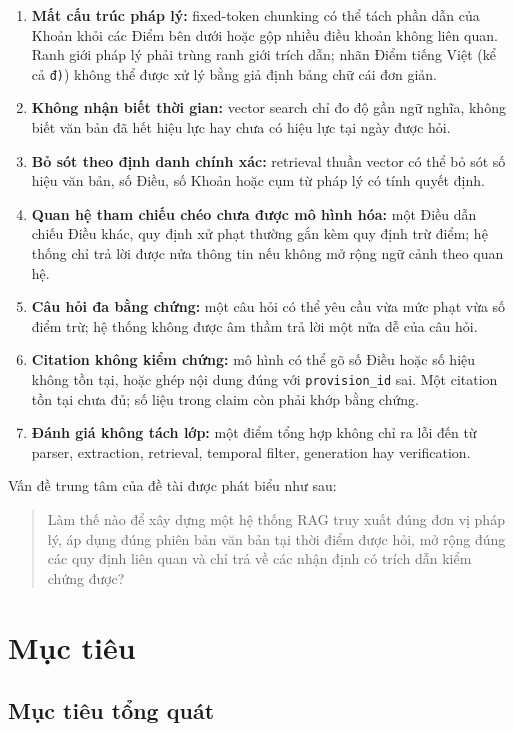 \documentclass[a4paper,12pt]{extreport}
\newcommand{\code}[1]{\texttt{#1}}
\begin{document}
\begin{enumerate}
  \item \textbf{Mất cấu trúc pháp lý:} fixed-token chunking có thể tách phần dẫn của Khoản khỏi các Điểm bên dưới hoặc gộp nhiều điều khoản không liên quan. Ranh giới pháp lý phải trùng ranh giới trích dẫn; nhãn Điểm tiếng Việt (kể cả \code{đ)}) không thể được xử lý bằng giả định bảng chữ cái đơn giản.
  \item \textbf{Không nhận biết thời gian:} vector search chỉ đo độ gần ngữ nghĩa, không biết văn bản đã hết hiệu lực hay chưa có hiệu lực tại ngày được hỏi.
  \item \textbf{Bỏ sót theo định danh chính xác:} retrieval thuần vector có thể bỏ sót số hiệu văn bản, số Điều, số Khoản hoặc cụm từ pháp lý có tính quyết định.
  \item \textbf{Quan hệ tham chiếu chéo chưa được mô hình hóa:} một Điều dẫn chiếu Điều khác, quy định xử phạt thường gắn kèm quy định trừ điểm; hệ thống chỉ trả lời được nửa thông tin nếu không mở rộng ngữ cảnh theo quan hệ.
  \item \textbf{Câu hỏi đa bằng chứng:} một câu hỏi có thể yêu cầu vừa mức phạt vừa số điểm trừ; hệ thống không được âm thầm trả lời một nửa dễ của câu hỏi.
  \item \textbf{Citation không kiểm chứng:} mô hình có thể gõ số Điều hoặc số hiệu không tồn tại, hoặc ghép nội dung đúng với \code{provision\_id} sai. Một citation tồn tại chưa đủ; số liệu trong claim còn phải khớp bằng chứng.
  \item \textbf{Đánh giá không tách lớp:} một điểm tổng hợp không chỉ ra lỗi đến từ parser, extraction, retrieval, temporal filter, generation hay verification.
\end{enumerate}

Vấn đề trung tâm của đề tài được phát biểu như sau:

\begin{quote}
Làm thế nào để xây dựng một hệ thống RAG truy xuất đúng đơn vị pháp lý, áp dụng đúng phiên bản văn bản tại thời điểm được hỏi, mở rộng đúng các quy định liên quan và chỉ trả về các nhận định có trích dẫn kiểm chứng được?
\end{quote}

\section{Mục tiêu}

\subsection{Mục tiêu tổng quát}
\end{document}
